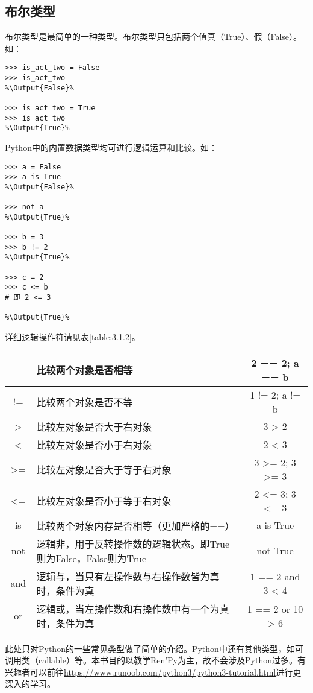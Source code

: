 \subsection{布尔类型}
布尔类型是最简单的一种类型。布尔类型只包括两个值真（True）、假（False）。如：
\begin{lstlisting}
>>> is_act_two = False
>>> is_act_two
%\Output{False}%

>>> is_act_two = True
>>> is_act_two
%\Output{True}%
\end{lstlisting}

Python中的内置数据类型均可进行逻辑运算和比较。如：
\begin{lstlisting}
>>> a = False
>>> a is True
%\Output{False}%

>>> not a
%\Output{True}%

>>> b = 3
>>> b != 2
%\Output{True}%

>>> c = 2
>>> c <= b
# 即 2 <= 3

%\Output{True}%
\end{lstlisting}
详细逻辑操作符请见表\ref{table:3.1.2}。

\begin{center}
    \tabletail{\hline}
    \tablelasttail{\hline}
    \label{table:3.1.2}
    \begin{supertabular}{|c|p{8cm}|c|}
        \hline
        == & 比较两个对象是否相等 & 2 == 2; a == b\\
        \hline
        != & 比较两个对象是否不等 & 1 != 2; a != b\\
        \hline
        > & 比较左对象是否大于右对象 & 3 > 2\\
        \hline
        < & 比较左对象是否小于右对象 & 2 < 3\\
        \hline
        >= & 比较左对象是否大于等于右对象 & 3 >= 2; 3 >= 3\\
        \hline
        <= & 比较左对象是否小于等于右对象 & 2 <= 3; 3 <= 3\\
        \hline
        is & 比较两个对象内存是否相等（更加严格的==）& a is True\\
        \hline
        not & 逻辑非，用于反转操作数的逻辑状态。即True则为False，False则为True & not True\\
        \hline
        and & 逻辑与，当只有左操作数与右操作数皆为真时，条件为真 & 1 == 2 and 3 < 4\\
        \hline
        or & 逻辑或，当左操作数和右操作数中有一个为真时，条件为真 & 1 == 2 or 10 > 6\\
        \hline
    \end{supertabular}
\end{center}

\begin{ExtraKnowledge}
    此处只对Python的一些常见类型做了简单的介绍。Python中还有其他类型，如可调用类（callable）等。本书目的以教学Ren'Py为主，故不会涉及Python过多。有兴趣者可以前往\url{https://www.runoob.com/python3/python3-tutorial.html}进行更深入的学习。
\end{ExtraKnowledge}

